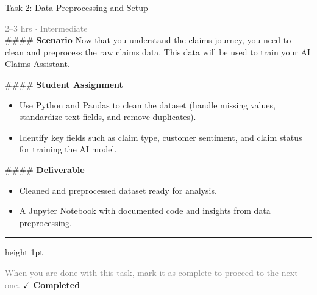 \documentclass[10pt,a4paper]{article}
\begin{document}
\begin{taskbox}{Task 2: Data Preprocessing and Setup}

    {\small \textcolor{gray}{2--3 hrs $\cdot$ Intermediate}}\\[12pt]

    \#\#\#\# \textbf{Scenario}  
Now that you understand the claims journey, you need to clean and preprocess the raw claims data. This data will be used to train your AI Claims Assistant.  

\#\#\#\# \textbf{Student Assignment}  
\begin{itemize}
    \item Use Python and Pandas to clean the dataset (handle missing values, standardize text fields, and remove duplicates).  
    \item Identify key fields such as claim type, customer sentiment, and claim status for training the AI model.  
\end{itemize}

\#\#\#\# \textbf{Deliverable}  
\begin{itemize}
    \item Cleaned and preprocessed dataset ready for analysis.  
    \item A Jupyter Notebook with documented code and insights from data preprocessing.\par
\end{itemize}

    \vspace{16pt}

    \textcolor{cardBorder}{\hrule height 1pt}\vspace{8pt}

    \small \textcolor{gray}{When you are done with this task, mark it as complete to proceed to the next one.} \hfill \textbf{\textcolor{brandDark}{$\checkmark$ Completed}}

\end{taskbox}
\end{document}
